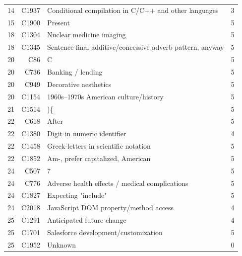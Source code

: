 \begin{tabular}{@{}rrp{}r@{}}
  14 & C1937 & Conditional compilation in C/C++ and other languages & 3 \\
  15 & C1900 & Present & 5 \\
  18 & C1304 & Nuclear medicine imaging & 5 \\
  18 & C1345 & Sentence-final additive/concessive adverb pattern, anyway & 5 \\
  20 & C86 & C & 5 \\
  20 & C736 & Banking / lending & 5 \\
  20 & C949 & Decorative aesthetics & 5 \\
  20 & C1154 & 1960s--1970s American culture/history & 5 \\
  21 & C1514 & )\{ & 5 \\
  22 & C618 & After & 5 \\
  22 & C1380 & Digit in numeric identifier & 4 \\
  22 & C1458 & Greek-letters in scientific notation & 5 \\
  22 & C1852 & Am-, prefer capitalized, American & 5 \\
  24 & C507 & 7 & 5 \\
  24 & C776 & Adverse health effects / medical complications & 5 \\
  24 & C1827 & Expecting "include" & 5 \\
  24 & C2018 & JavaScript DOM property/method access & 4 \\
  25 & C1291 & Anticipated future change & 4 \\
  25 & C1701 & Salesforce development/customization & 5 \\
  25 & C1952 & Unknown & 0 \\
  \bottomrule
\end{tabular}
